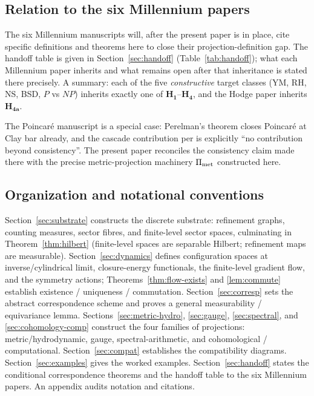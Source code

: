 \documentclass[11pt, a4paper]{amsart}
\theoremstyle{definition}
\newcommand{\met}{{\rm met}}
\begin{document}
\subsection{Relation to the six Millennium papers}
\label{subsec:relation-to-millennium}

The six Millennium manuscripts will, after the present paper is in
place, cite specific definitions and theorems here to close their
projection-definition gap. The handoff table is given in
Section~\ref{sec:handoff} (Table~\ref{tab:handoff}); what each
Millennium paper inherits and what remains open after that
inheritance is stated there precisely. A summary: each of the
five \emph{constructive} target classes
(YM, RH, NS, BSD, $P$ vs $NP$) inherits exactly one of
$\mathbf{H_1}$--$\mathbf{H_4}$, and the Hodge paper inherits
$\mathbf{H_{4a}}$.

The Poincar\'e manuscript \cite{MillenniumPoincare} is a special
case: Perelman's theorem closes Poincar\'e at Clay bar already,
and the cascade contribution per
\cite[\S MP6.3]{CascadeMillennium} is explicitly ``no contribution
beyond consistency''. The present paper reconciles the
consistency claim made there with the precise metric-projection
machinery $\Pi_{\met}$ constructed here.

\subsection{Organization and notational conventions}
\label{subsec:organization}

Section~\ref{sec:substrate} constructs the discrete substrate:
refinement graphs, counting measures, sector fibres, and
finite-level sector spaces, culminating in Theorem~\ref{thm:hilbert}
(finite-level spaces are separable Hilbert; refinement maps are
measurable). Section~\ref{sec:dynamics} defines configuration
spaces at inverse/cylindrical limit, closure-energy functionals,
the finite-level gradient flow, and the symmetry actions;
Theorems~\ref{thm:flow-exists} and \ref{lem:commute} establish
existence / uniqueness / commutation. Section~\ref{sec:corresp}
sets the abstract correspondence scheme and proves a general
measurability / equivariance lemma. Sections~\ref{sec:metric-hydro},
\ref{sec:gauge}, \ref{sec:spectral}, and \ref{sec:cohomology-comp}
construct the four families of projections:
metric/hydrodynamic, gauge, spectral-arithmetic, and
cohomological / computational. Section~\ref{sec:compat} establishes
the compatibility diagrams. Section~\ref{sec:examples} gives the
worked examples. Section~\ref{sec:handoff} states the conditional
correspondence theorems and the handoff table to the six Millennium
papers. An appendix audits notation and citations.
\end{document}
